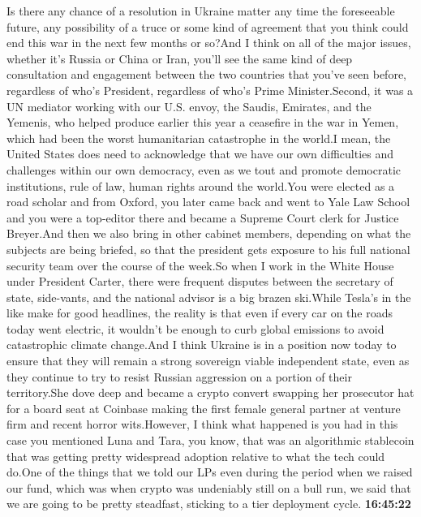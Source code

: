 \documentclass{article}%
\begin{document}
\newline%
Is there any chance of a resolution in Ukraine matter any time the foreseeable future, any possibility of a truce or some kind of agreement that you think could end this war in the next few months or so?And I think on all of the major issues, whether it's Russia or China or Iran, you'll see the same kind of deep consultation and engagement between the two countries that you've seen before, regardless of who's President, regardless of who's Prime Minister.Second, it was a UN mediator working with our U.S. envoy, the Saudis, Emirates, and the Yemenis, who helped produce earlier this year a ceasefire in the war in Yemen, which had been the worst humanitarian catastrophe in the world.I mean, the United States does need to acknowledge that we have our own difficulties and challenges within our own democracy, even as we tout and promote democratic institutions, rule of law, human rights around the world.You were elected as a road scholar and from Oxford, you later came back and went to Yale Law School and you were a top{-}editor there and became a Supreme Court clerk for Justice Breyer.And then we also bring in other cabinet members, depending on what the subjects are being briefed, so that the president gets exposure to his full national security team over the course of the week.So when I work in the White House under President Carter, there were frequent disputes between the secretary of state, side{-}vants, and the national advisor is a big brazen ski.While Tesla's in the like make for good headlines, the reality is that even if every car on the roads today went electric, it wouldn't be enough to curb global emissions to avoid catastrophic climate change.And I think Ukraine is in a position now today to ensure that they will remain a strong sovereign viable independent state, even as they continue to try to resist Russian aggression on a portion of their territory.She dove deep and became a crypto convert swapping her prosecutor hat for a board seat at Coinbase making the first female general partner at venture firm and recent horror wits.However, I think what happened is you had in this case you mentioned Luna and Tara, you know, that was an algorithmic stablecoin that was getting pretty widespread adoption relative to what the tech could do.One of the things that we told our LPs even during the period when we raised our fund, which was when crypto was undeniably still on a bull run, we said that we are going to be pretty steadfast, sticking to a tier deployment cycle.%
\textbf{16:45:22}%
\newline%
\end{document}
